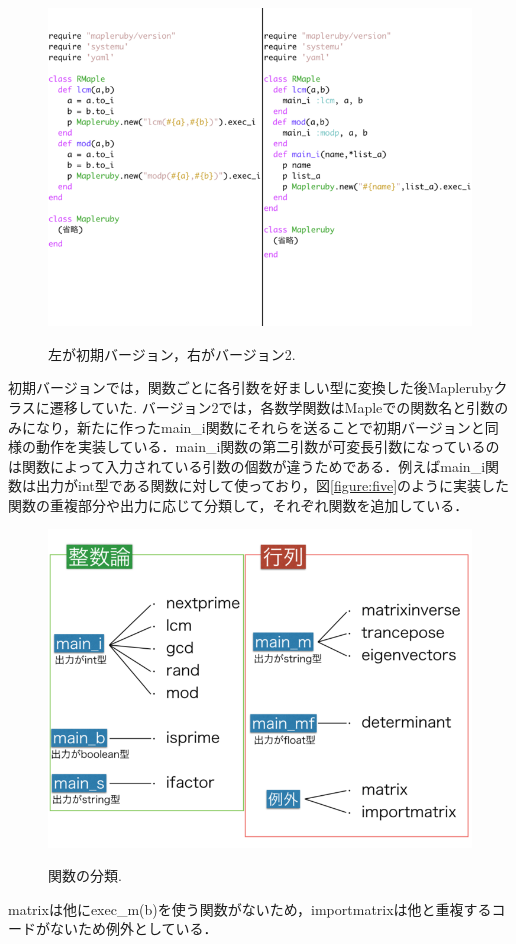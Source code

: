 \documentclass[10pt,a4j]{article}
\begin{document}
\begin{figure}[htbp]\begin{center}
\includegraphics[width=12cm,bb= 0 0 937 753]{../figs/./mapleruby_eringi.006.png}
\caption{左が初期バージョン，右がバージョン2.}
\label{figure:four}
\label{default}\end{center}\end{figure}
初期バージョンでは，関数ごとに各引数を好ましい型に変換した後Maplerubyクラスに遷移していた.
バージョン2では，各数学関数はMapleでの関数名と引数のみになり，新たに作ったmain\_i関数にそれらを送ることで初期バージョンと同様の動作を実装している．main\_i関数の第二引数が可変長引数になっているのは関数によって入力されている引数の個数が違うためである．例えばmain\_i関数は出力がint型である関数に対して使っており，図\ref{figure:five}のように実装した関数の重複部分や出力に応じて分類して，それぞれ関数を追加している．
\newpage

\begin{figure}[htbp]\begin{center}
\includegraphics[width=12cm,bb= 0 0 937 753]{../figs/./mapleruby_eringi.007.png}
\caption{関数の分類.}
\label{figure:five}
\label{default}\end{center}\end{figure}
matrixは他にexec\_m(b)を使う関数がないため，importmatrixは他と重複するコードがないため例外としている．
\end{document}
